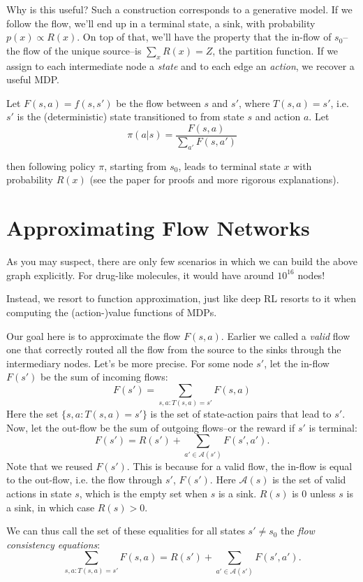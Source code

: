 Why is this useful? Such a construction corresponds to a generative model. If we follow the flow, we'll end up in a terminal state, a sink, with probability $p(x) \propto R(x)$. On top of that, we'll have the property that the in-flow of $s_0$--the flow of the unique source--is $\sum_x R(x)=Z$, the partition function. If we assign to each intermediate node a \emph{state} and to each edge an \emph{action}, we recover a useful MDP.

Let $F(s,a)=f(s,s')$ be the flow between $s$ and $s'$, where $T(s,a)=s'$, i.e. $s'$ is the (deterministic) state transitioned to from state $s$ and action $a$. Let
$$\pi(a|s) = \frac{F(s,a)}{\sum_{a'}F(s,a')}$$


then following policy $\pi$, starting from $s_0$, leads to terminal state $x$ with probability $R(x)$ (see the paper for proofs and more rigorous explanations).

\section{Approximating Flow Networks}

As you may suspect, there are only few scenarios in which we can build the above graph explicitly. For drug-like molecules, it would have around $10^{16}$ nodes!

Instead, we resort to function approximation, just like deep RL resorts to it when computing the (action-)value functions of MDPs.

Our goal here is to approximate the flow $F(s,a)$. Earlier we called a \emph{valid} flow one that correctly routed all the flow from the source to the sinks through the intermediary nodes. Let's be more precise. For some node $s'$, let the in-flow $F(s')$ be the sum of incoming flows:
$$F(s') = \sum_{s,a:T(s,a)=s'} F(s,a)$$
Here the set $\{s,a:T(s,a)=s'\}$ is the set of state-action pairs that lead to $s'$. Now, let the out-flow be the sum of outgoing flows--or the reward if $s'$ is terminal:
$$F(s') = R(s') + \sum_{a'\in\mathcal{A}(s')} F(s',a').$$
Note that we reused $F(s')$. This is because for a valid flow, the in-flow is equal to the out-flow, i.e. the flow through $s'$, $F(s')$. Here $\mathcal{A}(s)$ is the set of valid actions in state $s$, which is the empty set when $s$ is a sink. $R(s)$ is 0 unless $s$ is a sink, in which case $R(s)>0$.

We can thus call the set of these equalities for all states $s'\neq s_0$ the \emph{flow consistency equations}:
$$\sum_{s,a:T(s,a)=s'} F(s,a) = R(s') + \sum_{a'\in\mathcal{A}(s')} F(s',a').$$

